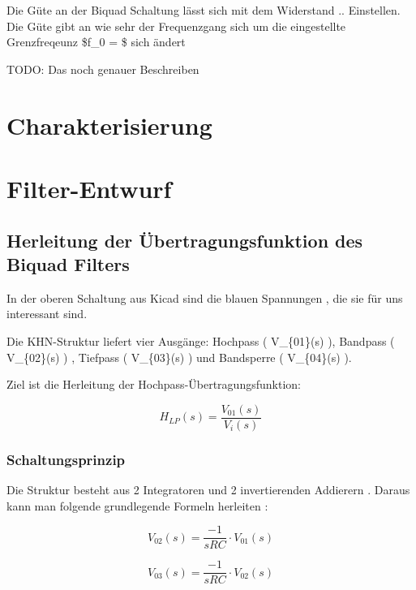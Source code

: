\documentclass[
  ngerman,
  letterpaper,
  DIV=11]{scrreprt}
\begin{document}
Die Güte an der Biquad Schaltung lässt sich mit dem Widerstand ..
Einstellen. Die Güte gibt an wie sehr der Frequenzgang sich um die
eingestellte Grenzfreqeunz \$f\_0 =  \$ sich
ändert

TODO: Das noch genauer Beschreiben

\chapter{Charakterisierung}\label{charakterisierung}

\chapter{Filter-Entwurf}\label{filter-entwurf}

\section{Herleitung der Übertragungsfunktion des Biquad
Filters}\label{herleitung-der-uxfcbertragungsfunktion-des-biquad-filters}

In der oberen Schaltung aus Kicad sind die blauen Spannungen , die sie
für uns interessant sind.

Die KHN-Struktur liefert vier Ausgänge: Hochpass ( V\_\{01\}(s) ),
Bandpass ( V\_\{02\}(s) ) , Tiefpass ( V\_\{03\}(s) ) und Bandsperre (
V\_\{04\}(s) ).

Ziel ist die Herleitung der Hochpass-Übertragungsfunktion:

\begin{equation}
H_{LP}(s) = \frac{V_{01}(s)}{V_{i}(s)}
\label{eq:HLP_def}
\end{equation}

\subsection*{Schaltungsprinzip}

Die Struktur besteht aus 2 Integratoren und 2 invertierenden Addierern .
Daraus kann man folgende grundlegende Formeln herleiten :

\begin{equation}
V_{02}(s) = \frac{-1}{sRC} \cdot V_{01}(s)
\label{eq:0P1}
\end{equation}

\begin{equation}
V_{03}(s) = \frac{-1}{sRC} \cdot V_{02}(s)
\label{eq:0P2}
\end{equation}
\end{document}
